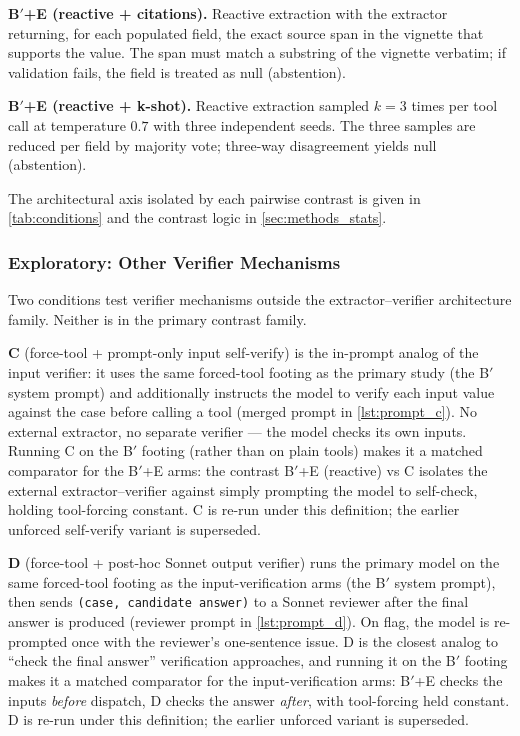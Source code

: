 \textbf{B$'$+E (reactive + citations).} Reactive extraction with the
extractor returning, for each populated field, the exact source span
in the vignette that supports the value. The span must match a
substring of the vignette verbatim; if validation fails, the field
is treated as null (abstention).

\textbf{B$'$+E (reactive + k-shot).} Reactive extraction sampled $k=3$
times per tool call at temperature $0.7$ with three independent
seeds. The three samples are reduced per field by majority vote;
three-way disagreement yields null (abstention).

The architectural axis isolated by each pairwise contrast is given
in \cref{tab:conditions} and the contrast logic in
\cref{sec:methods_stats}.

\subsubsection{Exploratory: Other Verifier Mechanisms}
\label{sec:methods_exploratory}

Two conditions test verifier mechanisms outside the
extractor--verifier architecture family. Neither is in the primary
contrast family.

\textbf{C} (force-tool + prompt-only input self-verify) is the
in-prompt analog of the input verifier: it uses the same forced-tool
footing as the primary study (the B$'$ system prompt) and additionally
instructs the model to verify each input value against the case before
calling a tool (merged prompt in \cref{lst:prompt_c}). No external
extractor, no separate verifier --- the model checks its own inputs.
Running C on the B$'$ footing (rather than on plain tools) makes it a
matched comparator for the B$'$+E arms: the contrast
B$'$+E (reactive) vs C isolates the external extractor--verifier
against simply prompting the model to self-check, holding tool-forcing
constant. C is re-run under this definition; the earlier unforced
self-verify variant is superseded.

\textbf{D} (force-tool + post-hoc Sonnet output verifier) runs the
primary model on the same forced-tool footing as the input-verification
arms (the B$'$ system prompt), then sends \texttt{(case, candidate
answer)} to a Sonnet reviewer after the final answer is produced
(reviewer prompt in \cref{lst:prompt_d}). On flag, the model is
re-prompted once with the reviewer's one-sentence issue. D is the
closest analog to ``check the final answer'' verification approaches,
and running it on the B$'$ footing makes it a matched comparator for
the input-verification arms: B$'$+E checks the inputs \emph{before}
dispatch, D checks the answer \emph{after}, with tool-forcing held
constant. D is re-run under this definition; the earlier unforced
variant is superseded.

